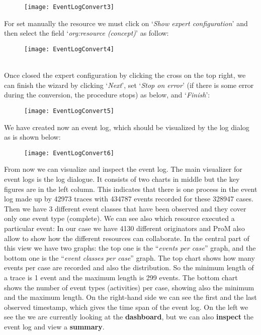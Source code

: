 \documentclass[paper=a4, fontsize=11pt]{scrartcl} %
\numberwithin{equation}{section} %
\numberwithin{figure}{section} %
\numberwithin{table}{section} %
\begin{document}
\begin{figure} [htbp]
\centering
\texttt{[image: EventLogConvert3]}
\end{figure}
\newpage
For set manually the resource we must click on ‘\textit{Show expert configuration}’ and then select the field ‘\textit{org:resource (concept)}’ as follow:
\begin{figure} [htbp]
\centering
\texttt{[image: EventLogConvert4]}
\end{figure}\\
Once closed the expert configuration by clicking the cross on the top right, we can finish the wizard by clicking ‘\textit{Next}’, set ‘\textit{Stop on error}’ (if there is some error during the conversion, the procedure stops) as below, and ‘\textit{Finish}’:
\begin{figure} [htbp]
\centering
\texttt{[image: EventLogConvert5]}
\end{figure}
\newpage
We have created now an event log, which should be visualized by the log dialog as is shown below:
\begin{figure} [htbp]
\centering
\texttt{[image: EventLogConvert6]}
\end{figure}
From now we can visualize and inspect the event log. The main visualizer for event logs is the log dialogue. It consists of two charts in middle but the key figures are in the left column. This indicates that there is one process in the event log made up by 42973 traces with 434787 events recorded for these 328947 cases. Then we have 3 different event classes that have been observed and they cover only one event type (complete). We can see also which resource executed a particular event: In our case we have 4130 different originators and ProM also allow to show how the different resources can collaborate. In the central part of this view we have two graphs: the top one is the ``\textit{events per case}'' graph, and the bottom one is the ``\textit{event classes per case}'' graph. The top chart shows how many events per case are recorded and also the distribution. So the minimum length of a trace is 1 event and the maximum length is 299 events. The bottom chart shows the number of event types (activities) per case, showing also the minimum and the maximum length. On the right-hand side we can see the first and the last observed timestamp, which gives the time span of the event log. On the left we see the we are currently looking at the \textbf{dashboard}, but we can also \textbf{inspect} the event log and view a \textbf{summary}.
\end{document}
